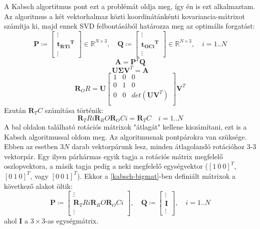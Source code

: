 \documentclass{article}
\begin{document}
	A Kabsch algortitmus pont ezt a problémát oldja meg, így én is ezt alkalmaztam. Az algoritmus a két vektorhalmaz közti koordinátánkénti kovariancia-mátrixot számítja ki, majd ennek SVD felbontásából határozza meg az optimális forgatást:
	\begin{equation}
	\label{kabsch-bigmat}
	\mathbf{P} \coloneqq \left[ \begin{matrix}
		\vdots \\
		\mathbf{{t_{RTi}}^T} \\
		\vdots
		\end{matrix} \right] \in \mathbb{R}^{N \times 3} , \quad
	\mathbf{Q} \coloneqq \left[ \begin{matrix}
		\vdots \\
		\mathbf{{t_{OCi}}^T} \\
		\vdots
		\end{matrix} \right] \in \mathbb{R}^{N \times 3} , \quad
		i = 1..N
	\end{equation}
	\begin{equation}
	\mathbf{A} = \mathbf{P}^T\mathbf{Q}
	\end{equation}
	\begin{equation}
	\mathbf{U \Sigma V}^T = \mathbf{A}
	\end{equation}
	\begin{equation}
	\mathbf{R}_OR = \mathbf{U}\left[
\begin{matrix}
1 & 0 & 0 \\
0 & 1 & 0 \\
0 & 0 & det(\mathbf{UV}^T) \\
\end{matrix}
	 \right]\mathbf{V}^T
	\end{equation}
	Ezután $\mathbf{R}_TC$ számítása történik: 
	\begin{equation}
	\mathbf{R}_TRi\mathbf{R}_RO\mathbf{R}_OCi = \mathbf{R}_TC\quad i = 1 .. N
	\end{equation}
	A bal oldalon található rotációs mátrixok "átlagát" kellene kiszámítani, ezt is a Kabsch algoritmussal oldom meg. Az algoritmusnak pontpárokra van szüksége. Ebben az esetben $3N$ darab vektorpárunk lesz, minden átlagolandó rotációhoz 3-3 vektorpár. Egy ilyen párhármas egyik tagja a rotációs mátrix megfelelő oszlopvektora, a másik tagja pedig a neki megfelelő egységvektor ($\left[1\:0\:0 \right]^T $, $\left[0\: 1\: 0 \right]^T $, vagy $\left[0\: 0\: 1 \right]^T $). Ekkor a \eqref{kabsch-bigmat}-ben definiált mátrixok a következő alakot öltik:
	\begin{equation}
	\mathbf{P} \coloneqq \left[ \begin{matrix}
		\vdots \\
		\mathbf{R}_TRi\mathbf{R}_RO\mathbf{R}_OCi \\
		\vdots
		\end{matrix} \right], \quad
	\mathbf{Q} \coloneqq \left[ \begin{matrix}
		\vdots \\
		\mathbf{I} \\
		\vdots
		\end{matrix} \right], \quad
		i = 1..N
	\end{equation}
	ahol $\mathbf{I}$ a $3\times 3$-as egységmátrix.
	
\end{document}

